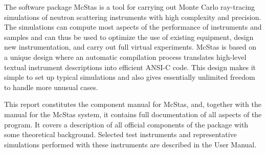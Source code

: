 The software package McStas is a tool for carrying out Monte Carlo
ray-tracing simulations of neutron scattering instruments with high
complexity and precision. The simulations can compute most aspects of the
performance of instruments and samples
and can thus be used to optimize the use of existing equipment,
design new instrumentation, and carry out full virtual experiments.
McStas is based on a unique design where an automatic compilation process
translates high-level textual instrument descriptions into efficient
ANSI-C code. This design makes it simple to set up typical simulations
and also gives essentially unlimited freedom to handle more unusual
cases.

This report constitutes the component manual for McStas, and,
together with the manual for the McStas system, it
contains full documentation of all aspects of the program. It covers
a description of all official components of the \MCS package with
some theoretical background. Selected test
instruments and representative \MCS simulations performed with these
instruments are described in the User Manual.

